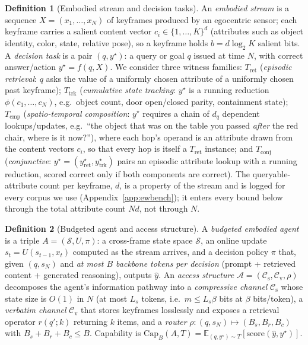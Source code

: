 \documentclass[10pt]{article}
\theoremstyle{definition}
\newtheorem{definition}{Definition}
\theoremstyle{plain}
\renewcommand{\Cap}{\mathrm{Cap}}
\newcommand{\cs}{\mathcal{C}_{\mathrm{s}}}
\newcommand{\cv}{\mathcal{C}_{\mathrm{v}}}
\newcommand{\A}{\mathcal{A}}
\begin{document}
\begin{definition}[Embodied stream and decision tasks]
\label{def:stream}
An \emph{embodied stream} is a sequence $X=(x_1,\dots,x_N)$ of keyframes produced by an egocentric sensor; each keyframe carries a salient content vector $c_i\in\{1,\dots,K\}^{d}$ (attributes such as object identity, color, state, relative pose), so a keyframe holds $b=d\log_2 K$ salient bits. A \emph{decision task} is a pair $(q,y^{\star})$: a query or goal $q$ issued at time $N$, with correct answer/action $y^{\star}=f(q,X)$. We consider three witness families:
$T_{\mathrm{ret}}$ (\emph{episodic retrieval}: $q$ asks the value of a uniformly chosen attribute of a uniformly chosen past keyframe);
$T_{\mathrm{trk}}$ (\emph{cumulative state tracking}: $y^{\star}$ is a running reduction $\phi(c_1,\dots,c_N)$, e.g.\ object count, door open/closed parity, containment state);
$T_{\mathrm{cmp}}$ (\emph{spatio-temporal composition}: $y^{\star}$ requires a chain of $d_q$ dependent lookups/updates, e.g.\ ``the object that was on the table you passed \emph{after} the red chair, where is it now?''), where each hop's operand is an attribute drawn from the content vectors $c_i$, so that every hop is itself a $T_{\mathrm{ret}}$ instance;
and $T_{\mathrm{conj}}$ (\emph{conjunctive}: $y^{\star}=(y^{\star}_{\mathrm{ret}},y^{\star}_{\mathrm{trk}})$ pairs an episodic attribute lookup with a running reduction, scored correct only if both components are correct).
The queryable-attribute count per keyframe, $d$, is a property of the stream and is logged for every corpus we use (Appendix~\ref{app:ewbench}); it enters every bound below through the total attribute count $Nd$, not through $N$.
\end{definition}

\begin{definition}[Budgeted agent and access structure]
\label{def:agent}
A \emph{budgeted embodied agent} is a triple $A=(\mathcal{S},U,\pi)$: a cross-frame state space $\mathcal{S}$, an online update $s_t=U(s_{t-1},x_t)$ computed as the stream arrives, and a decision policy $\pi$ that, given $(q,s_N)$ and \emph{at most $B$ backbone tokens per decision} (prompt + retrieved content + generated reasoning), outputs $\hat y$. An \emph{access structure} $\A=(\cs,\cv,\rho)$ decomposes the agent's information pathway into a \emph{compressive channel} $\cs$ whose state size is $O(1)$ in $N$ (at most $L_s$ tokens, i.e.\ $m\le L_s\beta$ bits at $\beta$ bits/token), a \emph{verbatim channel} $\cv$ that stores keyframes losslessly and exposes a retrieval operator $r(q';k)$ returning $k$ items, and a \emph{router} $\rho:(q,s_N)\mapsto(B_s,B_r,B_c)$ with $B_s+B_r+B_c\le B$. Capability is $\Cap_B(A,T)=\mathbb{E}_{(q,y^{\star})\sim T}[\mathrm{score}(\hat y,y^{\star})]$.
\end{definition}
\end{document}
